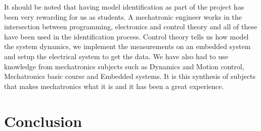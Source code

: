 It should be noted that having model identification as part of the project has
been very rewarding for us as students. A mechatronic engineer works in the
intersection between programming, electronics and control theory and all of
these have been used in the identification process. Control theory tells us how
model the system dynamics, we implement the measurements on an embedded system
and setup the electrical system to get the data. We have also had to use
knowledge from mechatronics subjects such as Dynamics and Motion control,
Mechatronics basic course and Embedded systems. It is this synthesis of subjects
that makes mechatronics what it is and it has been a great experience. 
\section{Conclusion}
